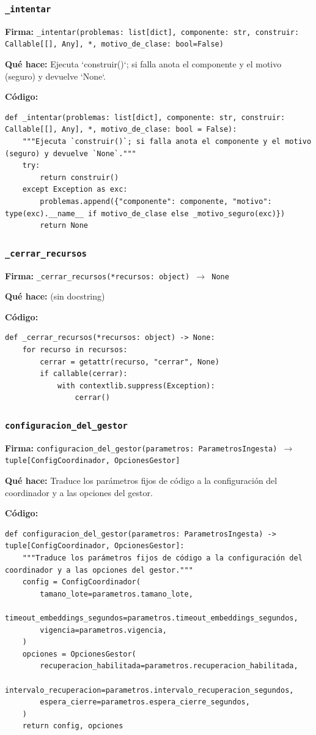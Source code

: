 \documentclass[11pt,a4paper]{article}
\begin{document}
\subsubsection*{\texttt{\_intentar}}
\textbf{Firma:} \texttt{\_intentar(problemas: list[dict], componente: str, construir: Callable[[], Any], *, motivo\_de\_clase: bool=False)}

\textbf{Qué hace:} Ejecuta `construir()`; si falla anota el componente y el motivo (seguro) y devuelve `None`.

\textbf{Código:}
\begin{lstlisting}
def _intentar(problemas: list[dict], componente: str, construir: Callable[[], Any], *, motivo_de_clase: bool = False):
    """Ejecuta `construir()`; si falla anota el componente y el motivo (seguro) y devuelve `None`."""
    try:
        return construir()
    except Exception as exc:
        problemas.append({"componente": componente, "motivo": type(exc).__name__ if motivo_de_clase else _motivo_seguro(exc)})
        return None
\end{lstlisting}

\subsubsection*{\texttt{\_cerrar\_recursos}}
\textbf{Firma:} \texttt{\_cerrar\_recursos(*recursos: object) $\rightarrow$ None}

\textbf{Qué hace:} (sin docstring)

\textbf{Código:}
\begin{lstlisting}
def _cerrar_recursos(*recursos: object) -> None:
    for recurso in recursos:
        cerrar = getattr(recurso, "cerrar", None)
        if callable(cerrar):
            with contextlib.suppress(Exception):
                cerrar()
\end{lstlisting}

\subsubsection*{\texttt{configuracion\_del\_gestor}}
\textbf{Firma:} \texttt{configuracion\_del\_gestor(parametros: ParametrosIngesta) $\rightarrow$ tuple[ConfigCoordinador, OpcionesGestor]}

\textbf{Qué hace:} Traduce los parámetros fijos de código a la configuración del coordinador y a las opciones del gestor.

\textbf{Código:}
\begin{lstlisting}
def configuracion_del_gestor(parametros: ParametrosIngesta) -> tuple[ConfigCoordinador, OpcionesGestor]:
    """Traduce los parámetros fijos de código a la configuración del coordinador y a las opciones del gestor."""
    config = ConfigCoordinador(
        tamano_lote=parametros.tamano_lote,
        timeout_embeddings_segundos=parametros.timeout_embeddings_segundos,
        vigencia=parametros.vigencia,
    )
    opciones = OpcionesGestor(
        recuperacion_habilitada=parametros.recuperacion_habilitada,
        intervalo_recuperacion=parametros.intervalo_recuperacion_segundos,
        espera_cierre=parametros.espera_cierre_segundos,
    )
    return config, opciones
\end{lstlisting}
\end{document}
